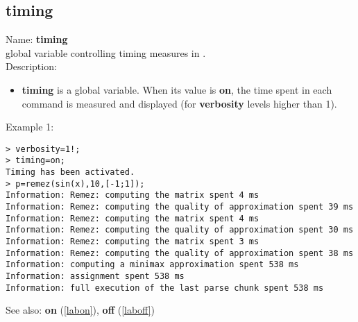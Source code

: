 \subsection{timing}
\label{labtiming}
\noindent Name: \textbf{timing}\\
global variable controlling timing measures in \sollya.\\
\noindent Description: \begin{itemize}

\item \textbf{timing} is a global variable. When its value is \textbf{on}, the time spent in each 
   command is measured and displayed (for \textbf{verbosity} levels higher than 1).
\end{itemize}
\noindent Example 1: 
\begin{center}\begin{minipage}{15cm}\begin{Verbatim}[frame=single]
> verbosity=1!;
> timing=on;
Timing has been activated.
> p=remez(sin(x),10,[-1;1]);
Information: Remez: computing the matrix spent 4 ms
Information: Remez: computing the quality of approximation spent 39 ms
Information: Remez: computing the matrix spent 4 ms
Information: Remez: computing the quality of approximation spent 30 ms
Information: Remez: computing the matrix spent 3 ms
Information: Remez: computing the quality of approximation spent 38 ms
Information: computing a minimax approximation spent 538 ms
Information: assignment spent 538 ms
Information: full execution of the last parse chunk spent 538 ms
\end{Verbatim}
\end{minipage}\end{center}
See also: \textbf{on} (\ref{labon}), \textbf{off} (\ref{laboff})

